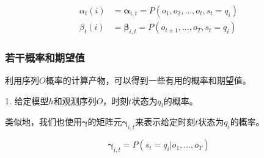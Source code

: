 \documentclass[]{article}
\begin{document}
    \begin{equation}
    	\begin{aligned}
    		\alpha_{t}(i)&=\boldsymbol{\alpha}_{i,t} = P(o_1,o_2,...,o_t, s_t=q_i)\\
    		\beta_{t}(i)&=\boldsymbol{\beta}_{i,t} = P(o_{t+1},...,o_T, s_t=q_i)
    	\end{aligned}
    \end{equation}



 
\subsubsection{若干概率和期望值}
	
	利用序列$O$概率的计算产物，可以得到一些有用的概率和期望值。
	
	1. 给定模型$h$和观测序列$O$，时刻$t$状态为$q_{i}$的概率。

    类似地，我们也使用$\boldsymbol{\gamma}$的矩阵元$\boldsymbol{\gamma}_{i,t}$来表示给定时刻$t$状态为$q_{i}$的概率。
   
   	\begin{equation}
   	\boldsymbol{\gamma}_{i,t}= P(s_{t}=q_{i}|o_{1},...,o_{T})
   \end{equation}
    
\end{document}
